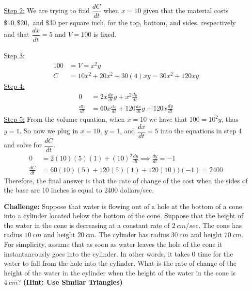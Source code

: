 \documentclass[11pt]{exam}
\begin{document}
\begin{questions}
\begin{solution}
\underline{Step 2:} We are trying to find $\dfrac{dC}{dt}$ when $x=10$ given that the material costs $\$10, \$20,$ and $\$30$ per square inch, for the top, bottom, and sides, respectively and that $\dfrac{dx}{dt}=5$ and $V=100$ is fixed. 
\\
\\\underline{Step 3:} \begin{align*}
100&=V=x^2y\\
C&=10x^2 +20x^2 +30(4)xy=30x^2+120xy
\end{align*}
\underline{Step 4:}
\begin{align*}
0&=2x\frac{dx}{dt}y+x^2\frac{dy}{dt}\\
\frac{dC}{dt}&=60x\frac{dx}{dt}+120\frac{dx}{dt}y+120x\frac{dy}{dt}
\end{align*}
\underline{Step 5:} From the volume equation, when $x=10$ we have that $100=10^2y$, thus $y=1$. So now we plug in $x=10$, $y=1$, and $\dfrac{dx}{dt}=5$ into the equations in step 4 and solve for $\dfrac{dC}{dt}$. 
\begin{align*}
0&=2(10)(5)(1)+(10)^2\frac{dy}{dt}\implies \frac{dy}{dt} = -1\\
\frac{dC}{dt}&=60(10)(5)+120(5)(1)+120(10))(-1)=2400
\end{align*}
Therefore, the final answer is that the rate of change of the cost when the sides of the base are 10 inches is equal to $2400$ dollars/sec. 
\end{solution}
\pagebreak
\question \textbf{Challenge:} Suppose that water is flowing out of a hole at the bottom of a cone into a cylinder located below the bottom of the cone. Suppose that the height of the water in the cone is decreasing at a constant rate of $2\ cm/sec$. The cone has radius $10\ cm$ and height $20\ cm$. The cylinder has radius $30\ cm$ and height $70\ cm$. For simplicity, assume that as soon as water leaves the hole of the cone it instantaneously goes into the cylinder. In other words, it takes 0 time for the water to fall from the hole into the cylinder. What is the rate of change of the height of the water in the cylinder when the height of the water in the cone is $4\ cm$? \textbf{(Hint: Use Similar Triangles)}
\\

\end{questions}
\end{document}
